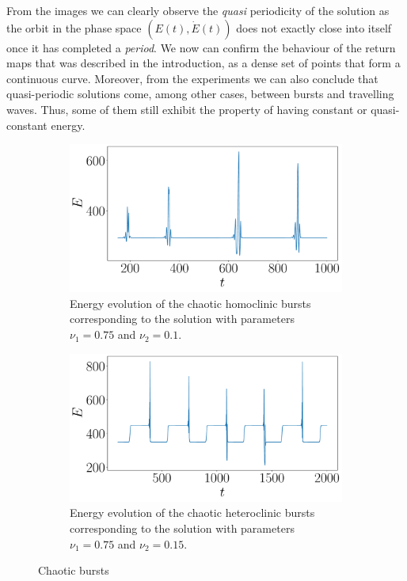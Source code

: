 \documentclass[twoside]{article}
\begin{document}
From the images we can clearly observe the \emph{quasi} periodicity of the solution as the orbit in the phase space $(E(t), \dot{E}(t))$ does not exactly close into itself once it has completed a \emph{period}. We now can confirm the behaviour of the return maps that was described in the introduction, as a dense set of points that form a continuous curve. Moreover, from the experiments we can also conclude that quasi-periodic solutions come, among other cases, between bursts and travelling waves. Thus, some of them still exhibit the property of having constant or quasi-constant energy.

\begin{figure}[ht]
  \centering
  \begin{subfigure}[ht]{0.45\textwidth}
    \includegraphics[width=\textwidth]{images/homo_chaotic.pdf}
    \caption{Energy evolution of the chaotic homoclinic bursts corresponding to the solution with parameters $\nu_1=0.75$ and $\nu_2=0.1$.}
  \end{subfigure}\hspace{0.033333\textwidth}
  \begin{subfigure}[ht]{0.45\textwidth}
    \includegraphics[width=\textwidth]{images/hetero_chaotic.pdf}
    \caption{Energy evolution of the chaotic heteroclinic bursts corresponding to the solution with parameters $\nu_1=0.75$ and $\nu_2=0.15$.}
  \end{subfigure}
  \caption{Chaotic bursts}
  \label{fig:chaotic_burst}
\end{figure}
\end{document}
